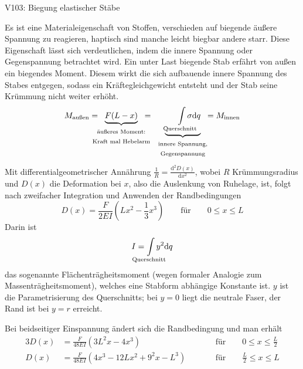\begin{Versuch}{V103: Biegung elastischer Stäbe}
\begin{Theorie}
            Es ist eine Materialeigenschaft von Stoffen,
            verschieden auf biegende äußere Spannung zu reagieren,
            haptisch sind manche leicht biegbar andere starr.
            Diese Eigenschaft lässt sich verdeutlichen, 
            indem die innere Spannung oder Gegenspannung betrachtet wird.
            Ein unter Last biegende Stab erfährt von außen ein biegendes Moment.
            Diesem wirkt die sich aufbauende innere Spannung des Stabes entgegen, sodass ein Kräftegleichgewicht entsteht und der Stab seine Krümmung nicht weiter erhöht.
           \begin{equation}
           	M_\text{außen}=\mkern-28mu\underbrace{F(L-x)}_{\begin{tabular}{c}\scriptsize äußeres Moment:\\ \scriptsize Kraft mal Hebelarm\end{tabular}}\mkern-28mu=\underbrace{\int\limits_{\text{Querschnitt}}\mkern-28mu\sigma \text{d}q}_{\begin{tabular}{c} \scriptsize innere Spannung,\\ \scriptsize Gegenspannung\end{tabular}}\mkern-16mu=M_\text{innen}
           \end{equation}
           Mit differentialgeometrischer Annährung $\frac{1}{R}=\frac{\text{d}^2 D(x)}{\text{d}x^2}$, wobei $R$ Krümmungsradius und $D(x)$ die Deformation bei $x$, also die Auslenkung von Ruhelage, ist, folgt nach zweifacher Integration und Anwenden der Randbedingungen
           \begin{equation}
           		D(x)=\frac{F}{2EI}(Lx^2-\frac{1}{3}x^3)\qquad\text{für}\qquad 0\le x\le L
           		\label{def1}
           \end{equation}
           Darin ist 
           \begin{equation}
           	I= \mkern-28mu \int\limits_{\text{Querschnitt}}\mkern-28mu y^2 \text{d}q
           \end{equation}
           das sogenannte Flächenträgheitsmoment 
           (wegen formaler Analogie zum Massenträgheitsmoment),
           welches eine Stabform abhängige Konstante ist.
           $y$ ist die Parametrisierung des Querschnitts; bei $y=0$ liegt die neutrale Faser, der Rand ist bei $y=r$ erreicht.

           Bei beidseitiger Einspannung ändert sich die Randbedingung und man erhält
           \begin{alignat}{3}
           		D(x)&=\frac{F}{48EI}(3L^2x-4x^3)\qquad&&\text{für}\qquad 0\le x\le \frac{L}{2}\\
           		D(x)&=\frac{F}{48EI}(4x^3-12Lx^2+9^2x-L^3)\qquad&&\text{für}\qquad \frac{L}{2}\le x\le L
           		\label{def2}
           \end{alignat}
        \end{Theorie}
        

\end{Versuch}
